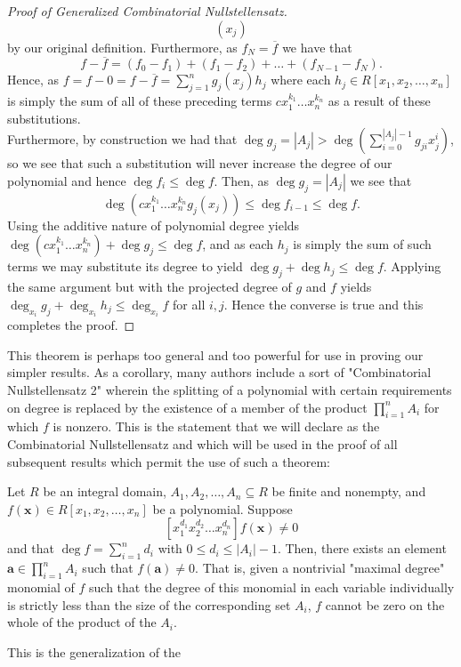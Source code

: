 \begin{proof}[Proof of Generalized Combinatorial Nullstellensatz]
\[\left( x_j \right)\] by our original definition. Furthermore, as $f_N =
\overline{f}$ we have that \[ f - \overline{f} = \left( f_0 - f_1 \right) +
\left( f_1 - f_2 \right) + \ldots + \left( f_{N-1} - f_N \right) .\] Hence, as
$f = f - 0 = f - \overline{f} = \sum_{j=1}^{n} g_j \left( x_{j} \right) h_j$
where each $h_j \in R[x_1, x_2, \ldots, x_{n}]$ is simply the sum of all of
these preceding terms $cx_1^{k_1}\ldots x_{n}^{ k_n}$ as a result of these
substitutions. \\Furthermore, by construction we had that $\deg g_j = \left| A_{j} \right| > \deg
\left( \sum_{i=0}^{\left| A_j \right| -1} g_{ji} x_{j}^{i} \right) $, so we see
that such a substitution will never increase the degree of our polynomial and
hence $\deg f_i \le \deg f$. Then, as $\deg g_j = \left| A_j \right| $ we see
that \[\deg\left( cx_1^{k_1}\ldots x_{n}^{k_n}g_j(x_j) \right) \le \deg
f_{i-1} \le \deg f.\] Using the additive nature of polynomial degree yields
\\$\deg \left( cx_1^{k_1}\ldots x_{n}^{ k_n} \right) + \deg g_j \le \deg f$,
and as each $h_j$ is simply the sum of such terms we may substitute its degree
to yield $\deg g_j + \deg h_j \le \deg f$.  Applying the same argument but with
the projected degree of $g$ and $f $ yields \\$\deg _{x_i} g_j + \deg _{x_i}
h_j \le \deg _{x_i} f$ for all $i,j$. Hence the converse is true and this
completes the proof.  \end{proof} This theorem is perhaps too general and too
powerful for use in proving our simpler results. As a corollary, many authors
include a sort of "Combinatorial Nullstellensatz 2" wherein the splitting of a
polynomial with certain requirements on degree is replaced by the existence of
a member of the product $\prod_{i= 1}^{n} A_i $ for which $f$ is nonzero. This
is the statement that we will declare as the Combinatorial Nullstellensatz and
which will be used in the proof of all subsequent results which permit the use of such a theorem:
\begin{theorem} Let
	$R$ be an integral domain, $A_1, A_2, \ldots, A_n \subseteq R$ be
	finite and nonempty, and \\$f\left( \textbf{x} \right) \in R[x_1, x_2,
	\ldots, x_{n}]$ be a polynomial. Suppose \[ [x_1^{d_1}x_2^{d_2}\ldots
	x_{n}^{d_n}] f\left( \textbf{x} \right) \neq 0 \] and that $\deg f =
	\sum_{i=1}^{n} d_i$ with $0 \le d_i \le \left| A_i \right| -1$. Then,
	there exists an element $ \textbf{a} \in \prod_{i= 1}^{n} A_i $ such
	that $f\left( \textbf{a} \right) \neq 0$. That is, given a nontrivial
	"maximal degree" monomial of $f$ such that the degree of this monomial
	in each variable individually is strictly less than the size of the
	corresponding set $A_i$, $f$ cannot be zero on the whole of the product
	of the $A_i$.  \end{theorem} This is the generalization of the
